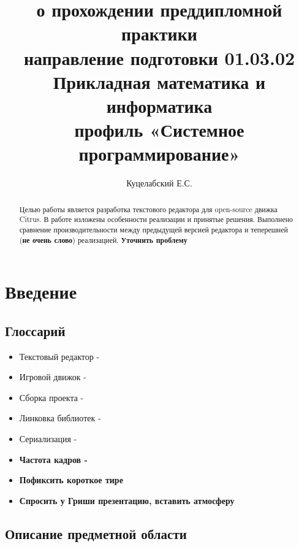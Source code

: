 \documentclass{fefu}
\begin{document}
	\title{о прохождении преддипломной практики\\направление подготовки 01.03.02 
	Прикладная математика и информатика\\профиль «Системное программирование»}
	\author{Куцелабский Е.С.}
	
	\makereporttitle
	\tableofcontents
	\newpage
	
	\begin{abstract}
		\par Целью работы является разработка текстового редактора для 
		open-source движка Citrus. 
		В работе изложены особенности реализации и принятые решения.
		Выполнено сравнение производительности между предыдущей версией редактора и
		теперешней (\textbf{не очень слово}) реализацией.
		\textbf{Уточнить проблему}
	\end{abstract}

	\section{Введение}
		\subsection{Глоссарий}
			\begin{itemize}
				\item Текстовый редактор - 
				\item Игровой движок - 
				\item Сборка проекта -
				\item Линковка библиотек -
				\item Сериализация - 
				\item \textbf{Частота кадров -}
				\item \textbf{Пофиксить короткое тире}
				\item \textbf{Спросить у Гриши презентацию, вставить атмосферу}
			\end{itemize}
		\subsection{Описание предметной области}
\end{document}

